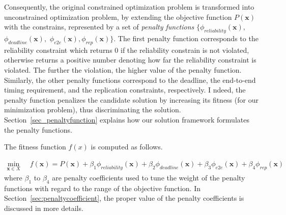 Consequently, the original constrained optimization problem is transformed into unconstrained optimization problem, by extending the objective function $P(\textbf{x})$ with the constrains, represented by a set of \textit{penalty functions} $\{\phi_{reliability}(\textbf{x}),$  $\phi_{deadline}(\textbf{x}),$ $\phi_{e2e}(\textbf{x}), \phi_{rep}(\textbf{x})\}$. The first penalty function corresponds to the reliability constraint which returns 0 if the reliability constrain is not violated, otherwise returns a positive number denoting how far the reliability constraint is violated. The further the violation, the higher value of the penalty function. Similarly, the other penalty functions correspond to the deadline, the end-to-end timing requirement, and the replication constraints, respectively. 
I
ndeed, the penalty function penalizes the candidate solution by increasing its fitness (for our minimization problem), thus discriminating the solution. Section~\ref{sec_penaltyfunction} explains how our solution framework formulates the penalty functions.

The fitness function $f(x)$ is computed as follows.


\begin{align}
\label{eqn_penalityfunc}
\min_{\textbf{x}\in X}\;\;& f(\textbf{x})=P(\textbf{x}) + \beta_1 \phi_{reliability}(\textbf{x}) + \beta_2 \phi_{deadline}(\textbf{x}) + \beta_3 \phi_{e2e}(\textbf{x}) + \beta_4 \phi_{rep}(\textbf{x}) 
\end{align}
where $\beta_1$ to $\beta_4$ are penalty coefficients used to tune the weight of the penalty functions with regard to the range of the objective function. In Section~\ref{sec:penaltycoefficient}, the proper value of the penalty coefficients is discussed in more details.

